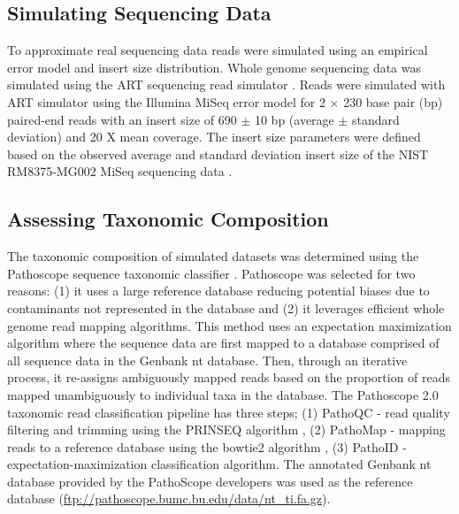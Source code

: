 \documentclass[fleqn,10pt,lineno]{wlpeerj}\usepackage[]{graphicx}\usepackage[]{color}
\begin{document}
\subsection*{Simulating Sequencing Data}
To approximate real sequencing data reads were simulated using an empirical error model and insert size distribution.
Whole genome sequencing data was simulated using the ART sequencing read simulator \citep{Huang2012}.
Reads were simulated with ART simulator using the Illumina MiSeq error model for 2 $\times$ 230 base pair (bp) paired-end reads with an insert size of 690 $\pm$ 10 bp (average $\pm$ standard deviation) and 20 X mean coverage.
The insert size parameters were defined based on the observed average and standard deviation insert size of the NIST RM8375-MG002 MiSeq sequencing data \citep{olson2016pepr}.

\subsection*{Assessing Taxonomic Composition}
The taxonomic composition of simulated datasets was determined using the Pathoscope sequence taxonomic classifier \citep{Francis2013}.
Pathoscope was selected for two reasons: (1) it uses a large reference database reducing potential biases due to contaminants not represented in the database and (2) it leverages efficient whole genome read mapping algorithms.
This method uses an expectation maximization algorithm where the sequence data are first mapped to a database comprised of all sequence data in the Genbank nt database.
Then, through an iterative process, it re-assigns ambiguously mapped reads based on the proportion of reads mapped unambiguously to individual taxa in the database.
The Pathoscope 2.0 taxonomic read classification pipeline has three steps; (1) PathoQC - read quality filtering and trimming using the PRINSEQ algorithm \citep{schmieder2011quality}, (2) PathoMap - mapping reads to a reference database using the bowtie2 algorithm \citep{Langmead2012}, (3) PathoID - expectation-maximization classification algorithm.
The annotated Genbank nt database provided by the PathoScope developers was used as the reference database (\url{ftp://pathoscope.bumc.bu.edu/data/nt\_ti.fa.gz}).
\end{document}
